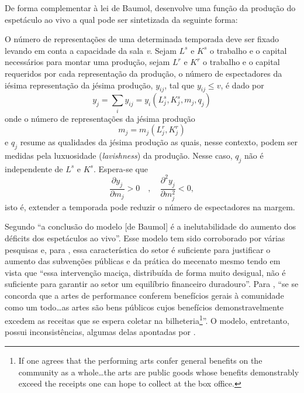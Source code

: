 \documentclass[a4paper, 12pt, openright, oneside, german, french, english, brazil]{abntex2}
\begin{document}
	De forma complementar à lei de Baumol,  desenvolve uma função da produção do espetáculo ao vivo a qual pode ser sintetizada da seguinte forma:
	
	O número de representações de uma determinada temporada deve ser fixado levando em conta a capacidade da sala \textit{v}. Sejam $L^s$ e $K^s$ o trabalho e o capital necessários para montar uma produção, sejam $L^r$ e $K^r$ o trabalho e o capital requeridos por cada representação da produção, o número de espectadores da iésima representação da jésima produção, $y_{ij}$, tal que $y_{ij} \leq v$, é dado por
	$$y_j = \sum_iy_{ij} = y_i(L^{s}_{j}, K^{s}_{j}, m_j, q_j) $$ onde
	o número de representações da jésima produção $$m_j = m_j(L^{r}_{j}, K^{r}_{j})$$ e $q_j$ resume as qualidades da jésima produção as quais, nesse contexto, podem ser medidas pela luxuosidade (\textit{lavishness}) da produção. Nesse caso, $q_j$ não é independente de $L^s$ e $K^s$. Espera-se que $$\frac{\partial y_j}{\partial m_j} > 0 \quad, \quad \frac{\partial^2y_j}{\partial m^{2}_{j}} < 0,$$ isto é, extender a temporada pode reduzir o número de espectadores na margem.
	
	Segundo  ``a conclusão do modelo [de Baumol] é a inelutabilidade do aumento dos déficits dos espetáculos ao vivo''. Esse modelo tem sido corroborado por várias pesquisas \cite[e.g.]{throsby1979economics,leroy1980economie,peacock1983inflation,baumol1984inflation,dias2011artes} e, para , essa característica do setor é suficiente para justificar o aumento das subvenções públicas e da prática do mecenato mesmo tendo em vista que ``essa intervenção maciça, distribuída de forma muito desigual, não é suficiente para garantir ao setor um equilíbrio financeiro duradouro''. Para , ``se se concorda que a artes de performance conferem benefícios gerais à comunidade como um todo\ldots as artes são bens públicos cujos benefícios demonstravelmente excedem as receitas que se espera coletar na bilheteria\footnote{If one agrees that the performing arts confer general benefits on the community as a whole\ldots the arts are public goods whose benefits demonstrably exceed the receipts one can hope to collect at the box office.}''. O modelo, entretanto, possui inconsistências, algumas delas apontadas por .
	
\end{document}
